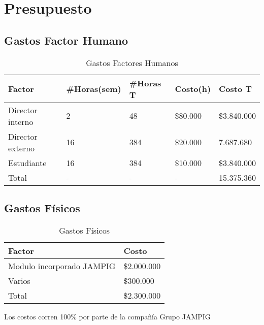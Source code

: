 \chapter{Presupuesto}

\section{Gastos Factor Humano}
\begin{table}[h]
  \begin{center}
    \begin{tabular}{|l|l|l|l|l|}
      \hline
      Factor           & \#Horas(sem) & \#Horas T & Costo(h) & Costo T     \\
      \hline \hline
      Director interno & 2            & 48        & \$80.000 & \$3.840.000 \\ \hline
      Director externo & 16           & 384       & \$20.000 & 7.687.680   \\
      \hline
      Estudiante       & 16           & 384       & \$10.000 & \$3.840.000 \\ \hline
      Total            & -            & -         & -        & 15.375.360  \\ \hline
    \end{tabular}
    \caption{Gastos Factores Humanos}
    \label{tabla:sencilla}
  \end{center}
\end{table}
\section{Gastos Físicos}
\begin{table}[h]
  \begin{center}
    \begin{tabular}{|l|l|}
      \hline
      Factor                    & Costo       \\
      \hline \hline
      Modulo incorporado JAMPIG & \$2.000.000 \\ \hline
      Varios                    & \$300.000   \\ \hline
      Total                     & \$2.300.000 \\ \hline
    \end{tabular}
    \caption{Gastos Físicos}
    \label{tabla:sencilla1}
  \end{center}
\end{table}

Los costos corren 100\% por parte de la compañía Grupo JAMPIG